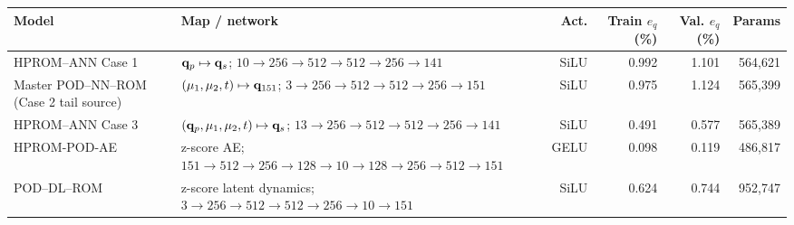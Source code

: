 \begin{tabular}{llrrrr}
\toprule
Model & Map / network & Act. & Train $e_q$ (\%) & Val. $e_q$ (\%) & Params \\
\midrule
HPROM--ANN Case 1 & $\mathbf q_p\mapsto\mathbf q_s$; $10\to256\to512\to512\to256\to141$ & SiLU & 0.992 & 1.101 & 564,621 \\
Master POD--NN--ROM (Case 2 tail source) & $(\mu_1,\mu_2,t)\mapsto\mathbf q_{151}$; $3\to256\to512\to512\to256\to151$ & SiLU & 0.975 & 1.124 & 565,399 \\
HPROM--ANN Case 3 & $(\mathbf q_p,\mu_1,\mu_2,t)\mapsto\mathbf q_s$; $13\to256\to512\to512\to256\to141$ & SiLU & 0.491 & 0.577 & 565,389 \\
HPROM-POD-AE & z-score AE; $151\to512\to256\to128\to10\to128\to256\to512\to151$ & GELU & 0.098 & 0.119 & 486,817 \\
POD--DL--ROM & z-score latent dynamics; $3\to256\to512\to512\to256\to10\to151$ & SiLU & 0.624 & 0.744 & 952,747 \\
\bottomrule
\end{tabular}
